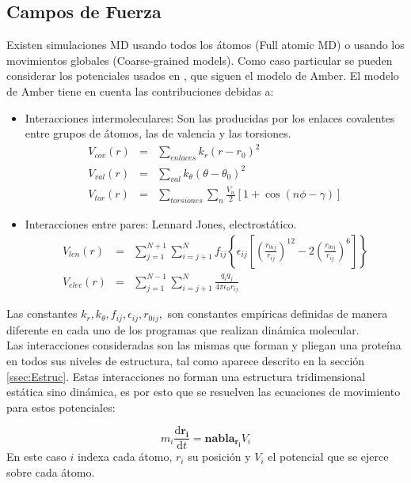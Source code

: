 \subsection{Campos de Fuerza}
Existen simulaciones MD usando todos los \'{a}tomos (Full atomic MD) o usando los movimientos globales (Coarse-grained models). Como caso particular se pueden considerar los potenciales usados en \cite{Amber2016}, que siguen el modelo de Amber. El modelo de Amber tiene en cuenta las contribuciones debidas a:
 \begin{itemize}
\item Interacciones intermoleculares: Son las producidas por los enlaces covalentes entre grupos de \'{a}tomos, las de valencia y las torsiones.
\begin{eqnarray}
V_{cov}(r)&=&\sum_{enlaces}k_r\left(r-r_0\right)^2\\
V_{val}(r)&=&\sum_{val}k_\theta\left(\theta-\theta_0\right)^2\\
V_{tor}(r)&=&\sum_{torsiones}\sum_{n}\frac{V_n}{2}\left[1+\cos(n\phi-\gamma)\right]
\end{eqnarray}
\item Interacciones entre pares: Lennard Jones, electrost\'{a}tico.
\begin{eqnarray}
V_{len}(r)&=&\sum_{j=1}^{N+1}\sum_{i=j+1}^N f_{ij}\left\{\epsilon_{ij}\left[\left(\frac{r_{0ij}}{r_{ij}}\right)^{12}-2\left(\frac{r_{0ij}}{r_{ij}}\right)^6\right]\right\}\\
V_{elec}(r)&=&\sum_{j=1}^{N-1}\sum_{i=j+1}^{N}\frac{q_iq_j}{4\pi\epsilon_0r_{ij}}
\end{eqnarray}
\end{itemize}
Las constantes $k_r,k_\theta,f_{ij},\epsilon_{ij},r_{0ij},$ son constantes emp\'{i}ricas definidas de manera diferente en cada uno de los programas que realizan din\'{a}mica molecular.\\

Las interacciones consideradas son las mismas que forman y pliegan una prote\'{i}na  en todos sus niveles de estructura, tal como aparece descrito en la secci\'{o}n \ref{ssec:Estruc}. Estas interacciones no forman una estructura tridimensional est\'{a}tica sino din\'{a}mica, es por esto que se resuelven las ecuaciones de movimiento para estos potenciales:

\begin{equation}\label{eq:50}
m_i\frac{\mathrm{d}\mathbf{r_i}}{\mathrm{d}t}=\mathbf{nabla}_\mathbf{r_i} V_i
\end{equation}
En este caso $i$ indexa cada \'{a}tomo, $r_i$ su posici\'{o}n y $V_i$ el potencial que se ejerce sobre cada \'{a}tomo.\\

